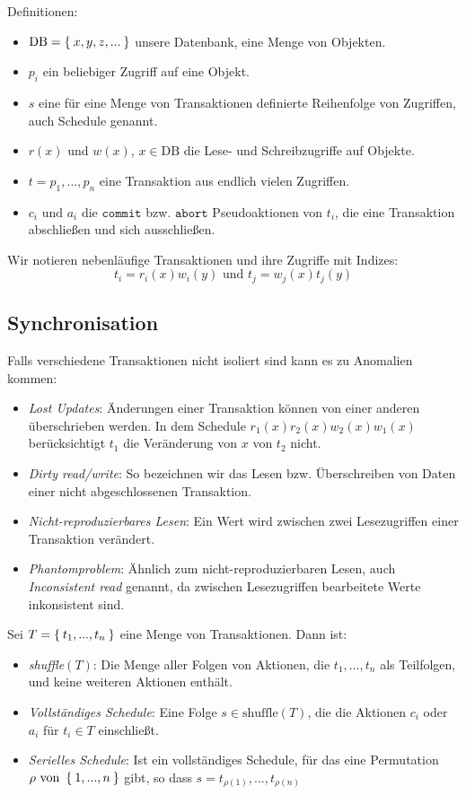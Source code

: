 \documentclass[a4paper,parskip=half*,DIV=15,fontsize=11pt]{scrartcl}
\begin{document}
Definitionen:
\begin{itemize}
\item $\textrm{DB} = \Set{x,y,z,...}$
unsere Datenbank, eine Menge von Objekten.
\item $p_i$
ein beliebiger Zugriff auf eine Objekt.
\item $s$
eine für eine Menge von Transaktionen definierte Reihenfolge von Zugriffen, auch Schedule genannt.
\item $r(x)$ und $w(x)$, $x \in \textrm{DB}$
die Lese- und Schreibzugriffe auf Objekte.
\item $t = p_1,...,p_n$
eine Transaktion aus endlich vielen Zugriffen.
\item $c_i \textrm{ und } a_i$
die $\texttt{commit}$ bzw. $\texttt{abort}$ Pseudoaktionen von $t_i$, die eine Transaktion abschließen und sich ausschließen.
\end{itemize}

Wir notieren nebenläufige Transaktionen und ihre Zugriffe mit Indizes:
$$t_i = r_i(x)w_i(y) \textrm{ und } t_j=w_j(x)t_j(y)$$

\subsection{Synchronisation}

Falls verschiedene Transaktionen nicht isoliert sind kann es zu Anomalien kommen:
\begin{itemize}
\item \emph{Lost Updates}: Änderungen einer Transaktion können von einer anderen überschrieben werden. In dem Schedule $r_1(x)r_2(x)w_2(x)w_1(x)$ berücksichtigt $t_1$ die Veränderung von $x$ von $t_2$ nicht.
\item \emph{Dirty read/write}: So bezeichnen wir das Lesen bzw. Überschreiben von Daten einer nicht abgeschlossenen Transaktion.
\item \emph{Nicht-reproduzierbares Lesen}: Ein Wert wird zwischen zwei Lesezugriffen einer Transaktion verändert.
\item \emph{Phantomproblem}: Ähnlich zum nicht-reproduzierbaren Lesen, auch \emph{Inconsistent read} genannt, da zwischen Lesezugriffen bearbeitete Werte inkonsistent sind.
\end{itemize}

Sei $T = \Set{t_1,...,t_n}$ eine Menge von Transaktionen. Dann ist:
\begin{itemize}
\item \emph{shuffle$(T)$}: Die Menge aller Folgen von Aktionen, die $t_1,...,t_n$ als Teilfolgen, und keine weiteren Aktionen enthält.
\item \emph{Vollständiges Schedule}: Eine Folge $s \in \textrm{shuffle}(T)$, die die Aktionen $c_i$ oder $a_i$ für $t_i \in T$ einschließt.
\item \emph{Serielles Schedule}: Ist ein vollständiges Schedule, für das eine Permutation $\rho \textrm{ von } \Set{1,...,n}$ gibt, so dass $s = t_{\rho(1)},...,t_{\rho(n)}$
\end{itemize}
\end{document}
